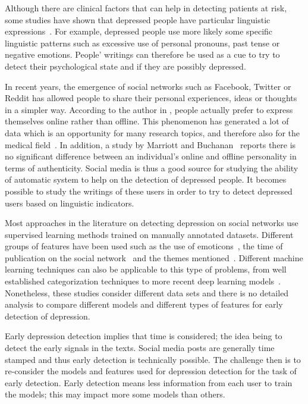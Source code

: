 \documentclass[graybox]{svmult}
\begin{document}
Although there are clinical factors that can help in detecting patients at risk, some studies have shown that depressed people have particular linguistic expressions~\cite{FranceSSSW00,OzdasSSSW04,low2011detection}. For example, depressed people use more likely some specific linguistic patterns such as excessive use of personal pronouns, past tense or negative emotions. People'  writings can therefore be used as a cue to try to detect their psychological state and if they are possibly depressed.

In recent years, the emergence of social networks such as Facebook, Twitter or Reddit has allowed people to share their personal experiences, ideas or thoughts in a simpler way. According to the author in \cite{kulkarni2018early}, people actually prefer to express themselves online rather than offline. This phenomenon has generated a lot of data which is an opportunity for many research topics, and therefore also for the medical field~\cite{DallouxCCBG20}. In addition, a study by Marriott and Buchanan~\cite{marriott2014true} reports  there is no significant difference between an individual's online and offline personality in terms of authenticity. Social media is thus a good source for studying the ability of automatic system to help on the detection of depressed people. It becomes possible to study the writings of these users in order to try to detect depressed users based on linguistic indicators. 

Most approaches in the literature on detecting depression on social networks use supervised learning methods trained on manually annotated datasets. Different groups of features have been used such as the use of emoticons~\cite{WangZJSWB13}, the time of publication on the social network~\cite{Choudhury2013} and the themes mentioned~\cite{Resnik2015}. Different machine learning techniques can also be applicable to this type of problems, from well established categorization techniques to more recent deep learning models~\cite{Faneva20}. Nonetheless, these studies consider different data sets and there is no detailed analysis to compare different models and different types of features for early detection of depression.

Early depression detection implies that time is considered; the idea being to detect the early signals in the texts. Social media posts are generally time stamped and thus early detection is technically possible. The challenge then is to re-consider the models and features used for depression detection for the task  of early detection. Early detection means less information from each user to train the models; this may impact more some models than others. 
\end{document}
